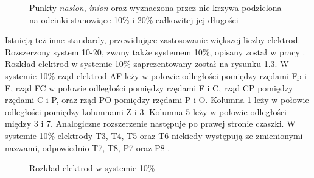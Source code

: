 \documentclass[notitlepage]{report}
\begin{document}
\begin{figure}[H]
	\centering
	\caption{Punkty \textit{nasion}, \textit{inion} oraz wyznaczona przez nie krzywa podzielona na odcinki stanowiące 10\% i 20\% całkowitej jej długości \cite{jasper}}
\end{figure}

Istnieją też inne standardy, przewidujące zastosowanie większej liczby elektrod. Rozszerzony system 10-20, zwany także systemem 10\%, opisany został w pracy \cite{nuwer}. Rozkład elektrod w systemie 10\% zaprezentowany został na rysunku 1.3. W systemie 10\% rząd elektrod AF leży w połowie odległości pomiędzy rzędami Fp i F, rząd FC w połowie odległości pomiędzy rzędami F i C, rząd CP pomiędzy rzędami C i P, oraz rząd PO pomiędzy rzędami P i O. Kolumna 1 leży w połowie odległości pomiędzy kolumnami Z i 3. Kolumna 5 leży w połowie odległości między 3 i 7. Analogiczne rozszerzenie następuje po prawej stronie czaszki. W systemie 10\% elektrody T3, T4, T5 oraz T6 niekiedy występują ze zmienionymi nazwami, odpowiednio T7, T8, P7 oraz P8 \cite{nuwer}.

\begin{figure}[H]
	\centering
	\caption{Rozkład elektrod w systemie 10\% \cite{nuwer}}
\end{figure}
\end{document}
